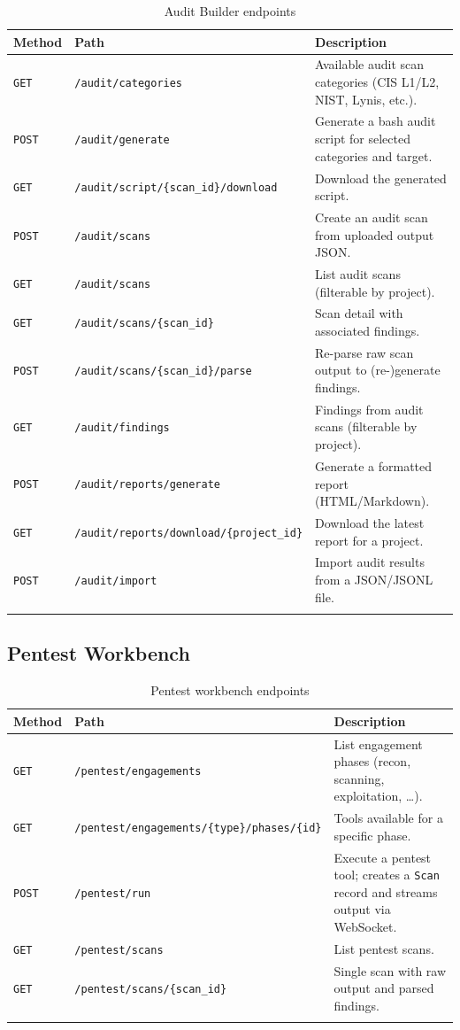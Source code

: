 \documentclass[11pt,a4paper,twoside,openright]{book}
\newcommand{\mget}{\colorbox{SeraphLow}{\color{white}\texttt{\footnotesize GET}}}
\newcommand{\mpost}{\colorbox{SeraphAccent}{\color{SeraphBg}\texttt{\footnotesize POST}}}
\begin{document}
\begin{longtable}{L{1.2cm} L{6.5cm} X}
\toprule
\textbf{Method} & \textbf{Path} & \textbf{Description} \\
\midrule
\endhead
\mget    & \texttt{/audit/categories}                      & Available audit scan categories (CIS L1/L2, NIST, Lynis, etc.). \\
\mpost   & \texttt{/audit/generate}                        & Generate a bash audit script for selected categories and target. \\
\mget    & \texttt{/audit/script/\{scan\_id\}/download}    & Download the generated script. \\
\mpost   & \texttt{/audit/scans}                           & Create an audit scan from uploaded output JSON. \\
\mget    & \texttt{/audit/scans}                           & List audit scans (filterable by project). \\
\mget    & \texttt{/audit/scans/\{scan\_id\}}              & Scan detail with associated findings. \\
\mpost   & \texttt{/audit/scans/\{scan\_id\}/parse}        & Re-parse raw scan output to (re-)generate findings. \\
\mget    & \texttt{/audit/findings}                        & Findings from audit scans (filterable by project). \\
\mpost   & \texttt{/audit/reports/generate}                & Generate a formatted report (HTML/Markdown). \\
\mget    & \texttt{/audit/reports/download/\{project\_id\}} & Download the latest report for a project. \\
\mpost   & \texttt{/audit/import}                          & Import audit results from a JSON/JSONL file. \\
\bottomrule
\caption{Audit Builder endpoints}
\end{longtable}

\subsection{Pentest Workbench}

\begin{longtable}{L{1.2cm} L{6.5cm} X}
\toprule
\textbf{Method} & \textbf{Path} & \textbf{Description} \\
\midrule
\endhead
\mget    & \texttt{/pentest/engagements}                     & List engagement phases (recon, scanning, exploitation, \ldots). \\
\mget    & \texttt{/pentest/engagements/\{type\}/phases/\{id\}} & Tools available for a specific phase. \\
\mpost   & \texttt{/pentest/run}                             & Execute a pentest tool; creates a \texttt{Scan} record and streams output via WebSocket. \\
\mget    & \texttt{/pentest/scans}                           & List pentest scans. \\
\mget    & \texttt{/pentest/scans/\{scan\_id\}}              & Single scan with raw output and parsed findings. \\
\bottomrule
\caption{Pentest workbench endpoints}
\end{longtable}
\end{document}
